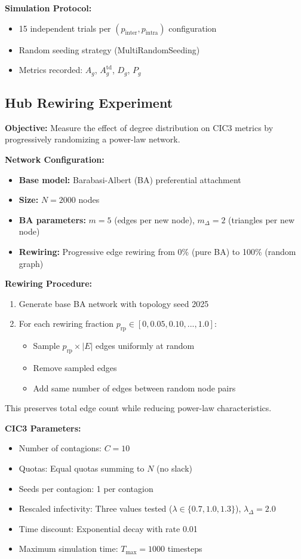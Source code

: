 \documentclass[sigconf]{acmart}
\begin{document}
\textbf{Simulation Protocol:}
\begin{itemize}
    \item 15 independent trials per $(p_{\text{inter}}, p_{\text{intra}})$ configuration
    \item Random seeding strategy (MultiRandomSeeding)
    \item Metrics recorded: $A_g$, $A_g^{\text{td}}$, $D_g$, $P_g$
\end{itemize}

\subsection{Hub Rewiring Experiment}
\label{app:hub}

\textbf{Objective:} Measure the effect of degree distribution on CIC3 metrics by progressively randomizing a power-law network.

\textbf{Network Configuration:}
\begin{itemize}
    \item \textbf{Base model:} Barabasi-Albert (BA) preferential attachment
    \item \textbf{Size:} $N=2000$ nodes
    \item \textbf{BA parameters:} $m=5$ (edges per new node), $m_{\Delta}=2$ (triangles per new node)
    \item \textbf{Rewiring:} Progressive edge rewiring from 0\% (pure BA) to 100\% (random graph)
\end{itemize}

\textbf{Rewiring Procedure:}
\begin{enumerate}
    \item Generate base BA network with topology seed 2025
    \item For each rewiring fraction $p_{\text{rp}} \in [0, 0.05, 0.10, ..., 1.0]$:
    \begin{itemize}
        \item Sample $p_{\text{rp}} \times |E|$ edges uniformly at random
        \item Remove sampled edges
        \item Add same number of edges between random node pairs
    \end{itemize}
\end{enumerate}

This preserves total edge count while reducing power-law characteristics.

\textbf{CIC3 Parameters:}
\begin{itemize}
    \item Number of contagions: $C=10$
    \item Quotas: Equal quotas summing to $N$ (no slack)
    \item Seeds per contagion: 1 per contagion
    \item Rescaled infectivity: Three values tested ($\lambda \in \{0.7, 1.0, 1.3\}$), $\lambda_{\Delta} = 2.0$
    \item Time discount: Exponential decay with rate 0.01
    \item Maximum simulation time: $T_{\text{max}} = 1000$ timesteps
\end{itemize}
\end{document}
